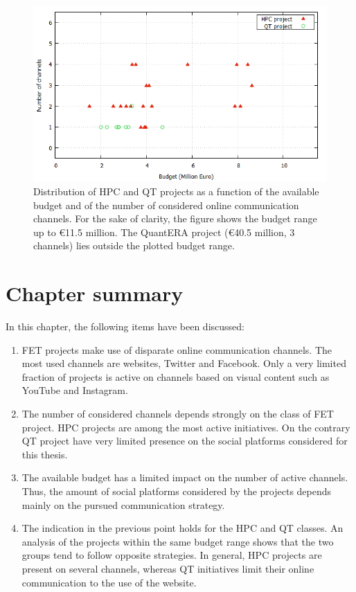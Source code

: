 \begin{figure}[!t] 
 \begin{center}
 \includegraphics[scale=0.45]{Images/Channel_budget_breakdown.png}
 \caption{Distribution of HPC and QT projects as a function of the available budget and of the number of considered online communication channels. For the sake of clarity, the figure shows the budget range up to \euro 11.5 million. The QuantERA project (\euro 40.5 million, 3 channels) lies outside the plotted budget range.}
 \label{Channel_budget_breakdown}
 \end{center}
\end{figure}

\section{Chapter summary} 
In this chapter, the following items have been discussed:

\begin{enumerate}
 \item FET projects make use of disparate online communication channels. The most used channels are websites, Twitter and Facebook. Only a very limited fraction of projects is active on channels based on visual content such as YouTube and Instagram.
 \item The number of considered channels depends strongly on the class of FET project. HPC projects are among the most active initiatives. On the contrary QT project have very limited presence on the social platforms considered for this thesis.
 \item The available budget has a limited impact on the number of active channels. Thus, the amount of social platforms considered by the projects depends mainly on the pursued communication strategy.
 \item The indication in the previous point holds for the HPC and QT classes. An analysis of the projects within the same budget range shows that the two groups tend to follow opposite strategies. In general, HPC projects are present on several channels, whereas QT initiatives limit their online communication to the use of the website.       
\end{enumerate}